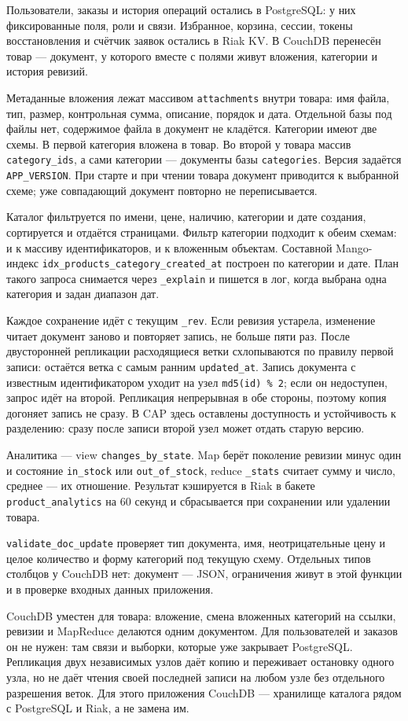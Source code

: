 \documentclass[12pt,a4paper]{article}
\begin{document}
Пользователи, заказы и история операций остались в PostgreSQL: у них фиксированные поля, роли и связи. Избранное, корзина, сессии, токены восстановления и счётчик заявок остались в Riak KV. В CouchDB перенесён товар --- документ, у которого вместе с полями живут вложения, категории и история ревизий.

Метаданные вложения лежат массивом \texttt{attachments} внутри товара: имя файла, тип, размер, контрольная сумма, описание, порядок и дата. Отдельной базы под файлы нет, содержимое файла в документ не кладётся. Категории имеют две схемы. В первой категория вложена в товар. Во второй у товара массив \texttt{category\_ids}, а сами категории --- документы базы \texttt{categories}. Версия задаётся \texttt{APP\_VERSION}. При старте и при чтении товара документ приводится к выбранной схеме; уже совпадающий документ повторно не переписывается.

Каталог фильтруется по имени, цене, наличию, категории и дате создания, сортируется и отдаётся страницами. Фильтр категории подходит к обеим схемам: и к массиву идентификаторов, и к вложенным объектам. Составной Mango-индекс \texttt{idx\_products\_category\_created\_at} построен по категории и дате. План такого запроса снимается через \texttt{\_explain} и пишется в лог, когда выбрана одна категория и задан диапазон дат.

Каждое сохранение идёт с текущим \texttt{\_rev}. Если ревизия устарела, изменение читает документ заново и повторяет запись, не больше пяти раз. После двусторонней репликации расходящиеся ветки схлопываются по правилу первой записи: остаётся ветка с самым ранним \texttt{updated\_at}. Запись документа с известным идентификатором уходит на узел \texttt{md5(id) \% 2}; если он недоступен, запрос идёт на второй. Репликация непрерывная в обе стороны, поэтому копия догоняет запись не сразу. В CAP здесь оставлены доступность и устойчивость к разделению: сразу после записи второй узел может отдать старую версию.

Аналитика --- view \texttt{changes\_by\_state}. Map берёт поколение ревизии минус один и состояние \texttt{in\_stock} или \texttt{out\_of\_stock}, reduce \texttt{\_stats} считает сумму и число, среднее --- их отношение. Результат кэшируется в Riak в бакете \texttt{product\_analytics} на 60 секунд и сбрасывается при сохранении или удалении товара.

\texttt{validate\_doc\_update} проверяет тип документа, имя, неотрицательные цену и целое количество и форму категорий под текущую схему. Отдельных типов столбцов у CouchDB нет: документ --- JSON, ограничения живут в этой функции и в проверке входных данных приложения.

CouchDB уместен для товара: вложение, смена вложенных категорий на ссылки, ревизии и MapReduce делаются одним документом. Для пользователей и заказов он не нужен: там связи и выборки, которые уже закрывает PostgreSQL. Репликация двух независимых узлов даёт копию и переживает остановку одного узла, но не даёт чтения своей последней записи на любом узле без отдельного разрешения веток. Для этого приложения CouchDB --- хранилище каталога рядом с PostgreSQL и Riak, а не замена им.
\end{document}

